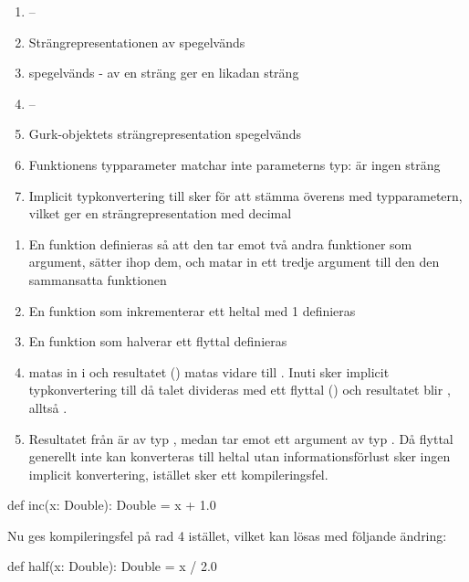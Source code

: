 \Task     %

\Subtask  \begin{enumerate}
\item --
\item Strängrepresentationen av  spegelvänds
\item {} spegelvänds -  av en sträng ger en likadan sträng
\item --
\item Gurk-objektets strängrepresentation spegelvänds
\item Funktionens typparameter matchar inte parameterns typ:  är ingen sträng
\item Implicit typkonvertering till  sker för att stämma överens med typparametern, vilket ger en strängrepresentation med decimal
\end{enumerate}

\Subtask  \begin{enumerate}
\item En funktion definieras så att den tar emot två andra funktioner som argument, sätter ihop dem, och matar in ett tredje argument till den den sammansatta funktionen
\item En funktion som inkrementerar ett heltal med 1 definieras
\item En funktion som halverar ett flyttal definieras
\item {} matas in i  och resultatet () matas vidare till . Inuti  sker implicit typkonvertering till  då talet divideras med ett flyttal () och resultatet blir , alltså .
\item Resultatet från  är av typ , medan  tar emot ett argument av typ . Då flyttal generellt inte kan konverteras till heltal utan informationsförlust sker ingen implicit konvertering, istället sker ett kompileringsfel.
\end{enumerate}

\Subtask \begin{Code}
def inc(x: Double): Double = x + 1.0
\end{Code}
Nu ges kompileringsfel på rad 4 istället, vilket kan lösas med följande ändring:
\begin{Code}
def half(x: Double): Double = x / 2.0
\end{Code}


